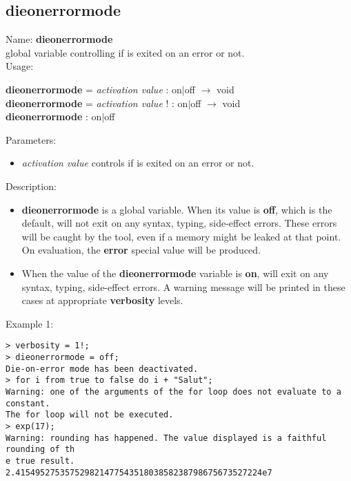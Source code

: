 \subsection{dieonerrormode}
\label{labdieonerrormode}
\noindent Name: \textbf{dieonerrormode}\\
global variable controlling if \sollya is exited on an error or not.\\
\noindent Usage: 
\begin{center}
\textbf{dieonerrormode} = \emph{activation value} : \textsf{on$|$off} $\rightarrow$ \textsf{void}\\
\textbf{dieonerrormode} = \emph{activation value} ! : \textsf{on$|$off} $\rightarrow$ \textsf{void}\\
\textbf{dieonerrormode} : \textsf{on$|$off}\\
\end{center}
Parameters: 
\begin{itemize}
\item \emph{activation value} controls if \sollya is exited on an error or not.
\end{itemize}
\noindent Description: \begin{itemize}

\item \textbf{dieonerrormode} is a global variable. When its value is \textbf{off}, which is the default,
   \sollya will not exit on any syntax, typing, side-effect errors. These
   errors will be caught by the tool, even if a memory might be leaked at 
   that point. On evaluation, the \textbf{error} special value will be produced.

\item When the value of the \textbf{dieonerrormode} variable is \textbf{on}, \sollya will exit
   on any syntax, typing, side-effect errors. A warning message will
   be printed in these cases at appropriate \textbf{verbosity} levels. 
\end{itemize}
\noindent Example 1: 
\begin{center}\begin{minipage}{15cm}\begin{Verbatim}[frame=single]
> verbosity = 1!;
> dieonerrormode = off;
Die-on-error mode has been deactivated.
> for i from true to false do i + "Salut";
Warning: one of the arguments of the for loop does not evaluate to a constant.
The for loop will not be executed.
> exp(17);
Warning: rounding has happened. The value displayed is a faithful rounding of th
e true result.
2.41549527535752982147754351803858238798675673527224e7
\end{Verbatim}
\end{minipage}\end{center}
